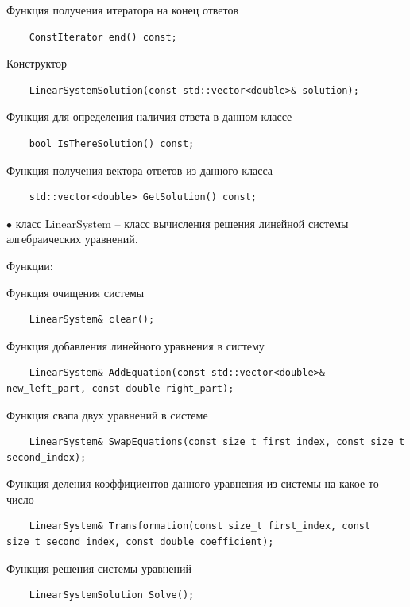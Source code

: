 \documentclass{article}
\theoremstyle{definition}
\theoremstyle{remark}
\begin{document}
Функция получения итератора на конец ответов

\begin{lstlisting}
	ConstIterator end() const;
\end{lstlisting}

Конструктор

\begin{lstlisting}
	LinearSystemSolution(const std::vector<double>& solution);
\end{lstlisting}

Функция для определения наличия ответа в данном классе

\begin{lstlisting}
	bool IsThereSolution() const;
\end{lstlisting}

Функция получения вектора ответов из данного класса
\begin{lstlisting}
	std::vector<double> GetSolution() const;
\end{lstlisting}

$\bullet$ класс LinearSystem -- класс вычисления решения линейной системы алгебраических уравнений.

Функции:

Функция очищения системы

\begin{lstlisting}
	LinearSystem& clear();
\end{lstlisting}

Функция добавления линейного уравнения в систему

\begin{lstlisting}
	LinearSystem& AddEquation(const std::vector<double>& new_left_part, const double right_part);
\end{lstlisting}

Функция свапа двух уравнений в системе
\begin{lstlisting}
	LinearSystem& SwapEquations(const size_t first_index, const size_t second_index);
\end{lstlisting}

Функция деления коэффициентов данного уравнения из системы на какое то число
\begin{lstlisting}
	LinearSystem& Transformation(const size_t first_index, const size_t second_index, const double coefficient);
\end{lstlisting}

Функция решения системы уравнений
\begin{lstlisting}
	LinearSystemSolution Solve();
\end{lstlisting}
\end{document}
